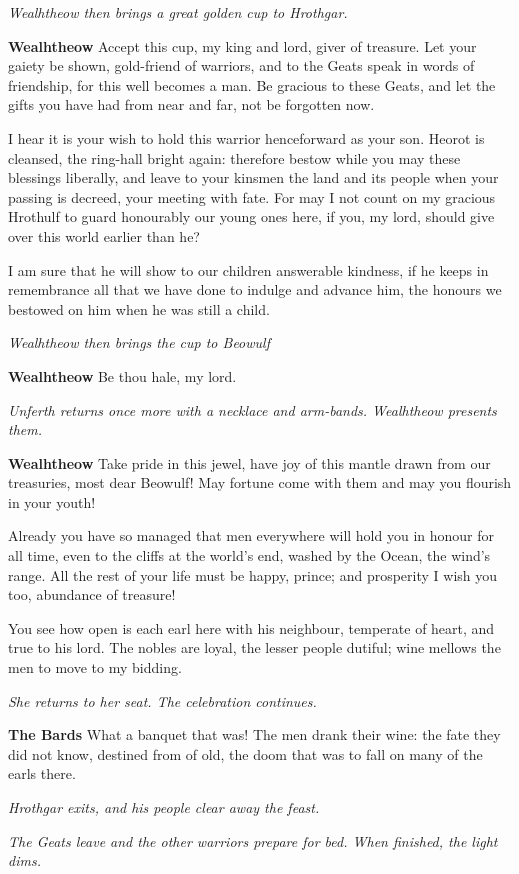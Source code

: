 \documentclass[a4paper]{article}
\begin{document}
{\centerline{\textit{Wealhtheow then brings a great golden cup to Hrothgar.}}

\textbf{Wealhtheow} Accept this cup, my king and lord,
giver of treasure. Let your gaiety be shown,
gold-friend of warriors, and to the Geats speak
in words of friendship, for this well becomes a man.
Be gracious to these Geats, and let the gifts you have had
from near and far, not be forgotten now.

I hear it is your wish to hold this warrior
henceforward as your son. Heorot is cleansed,
the ring-hall bright again: therefore bestow while you may
these blessings liberally, and leave to your kinsmen
the land and its people when your passing is decreed,
your meeting with fate. For may I not count
on my gracious Hrothulf to guard honourably
our young ones here, if you, my lord,
should give over this world earlier than he?

I am sure that he will show to our children
answerable kindness, if he keeps in remembrance
all that we have done to indulge and advance him,
the honours we bestowed on him when he was still a child.

\centerline{\textit{Wealhtheow then brings the cup to Beowulf}}

\textbf{Wealhtheow} Be thou hale, my lord.

\centerline{\textit{Unferth returns once more with a necklace and arm-bands. Wealhtheow presents them.}}

\textbf{Wealhtheow} Take pride in this jewel, have joy of this mantle
drawn from our treasuries, most dear Beowulf!
May fortune come with them and may you flourish in your youth!

Already you have so managed that men everywhere
will hold you in honour for all time,
even to the cliffs at the world’s end, washed by the Ocean,
the wind’s range. All the rest of your life
must be happy, prince; and prosperity I wish you too,
abundance of treasure! 

You see how open is each earl here with his neighbour,
temperate of heart, and true to his lord.
The nobles are loyal, the lesser people dutiful;
wine mellows the men to move to my bidding.

\centerline{\textit{She returns to her seat. The celebration continues.}}

\textbf{The Bards} What a banquet that was!
The men drank their wine: the fate they did not know,
destined from of old, the doom that was to fall
on many of the earls there.

\centerline{\textit{Hrothgar exits, and his people clear away the feast.}}
\centerline{\textit{The Geats leave and the other warriors prepare for bed. When finished, the light dims.}}

}
\end{document}
